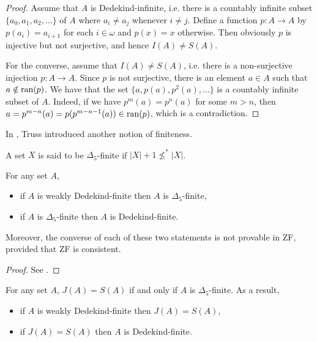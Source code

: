\begin{proof}
Assume that $A$ is Dedekind-infinite, i.e. there is a countably infinite subset $\{ a_{0}, a_{1}, a_{2}, \dotsc \}$ of $A$ where $a_{i}\neq a_{j}$ whenever $i\neq j$.   Define a function $p : A \to A$ by  $p(a_{i}) = a_{i+1}$ for each $i \in \omega$ and $p(x) = x$ otherwise. Then obviously $p$ is injective but not surjective, and hence $I(A) \neq S(A)$.

For the converse, assume that $I(A) \neq S(A)$, i.e. there is a non-surjective injection $p:A \to A$. Since $p$ is not surjective, there is an element $a \in A$ such that $a \notin \textup{ran}(p)$. We have that the set $\{ a, p(a), p^{2}(a), \dotsc \}$ is a countably infinite subset of $A$. Indeed, if we have $p^{m}(a) = p^{n}(a)$ for some $m>n$, then $a = p^{m-n}(a) = p( p^{m-n-1}(a) ) \in \textup{ran}(p)$, which is a contradiction.
\end{proof}

In \cite{Truss}, Truss introduced another notion of finiteness.

\begin{definition}
    A set $X$ is said to be $\Delta_5$-finite if $|X|+1 \nleq^* |X|$.
\end{definition} 



    
\begin{theorem}
For any set $A$,
\begin{itemize}
    \item[1)] if $A$ is weakly Dedekind-finite then $A$ is $\Delta_5$-finite,
    \item[2)] if $A$ is $\Delta_5$-finite then $A$ is Dedekind-finite.
\end{itemize}
Moreover, the converse of each of these two statements is not provable in ZF, provided that ZF is consistent. 
\end{theorem}

\begin{proof}
    See \cite[Lemma 3]{Truss}.
\end{proof}

\begin{theorem} \label{JS}
For any set $A$, $J(A)=S(A)$ if and only if $A$ is $\Delta_5$-finite. As a result,
\begin{itemize}
    \item[1)] if $A$ is weakly Dedekind-finite then $J(A)=S(A)$,
    \item[2)] if $J(A)=S(A)$ then $A$ is Dedekind-finite.
\end{itemize}
\end{theorem}


